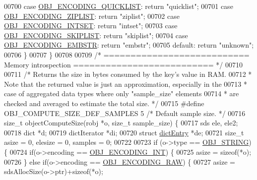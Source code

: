 \begin{DoxyCode}
{00700     \textcolor{keywordflow}{case} \hyperlink{server_8h_aec792aeed6d4bf83966672e6a23043b8}{OBJ\_ENCODING\_QUICKLIST}: \textcolor{keywordflow}{return} \textcolor{stringliteral}{"quicklist"};
00701     \textcolor{keywordflow}{case} \hyperlink{server_8h_aabf064ede983103f1fd0df2086e84eee}{OBJ\_ENCODING\_ZIPLIST}: \textcolor{keywordflow}{return} \textcolor{stringliteral}{"ziplist"};
00702     \textcolor{keywordflow}{case} \hyperlink{server_8h_a214173987de21c3b7661fddd42b05873}{OBJ\_ENCODING\_INTSET}: \textcolor{keywordflow}{return} \textcolor{stringliteral}{"intset"};
00703     \textcolor{keywordflow}{case} \hyperlink{server_8h_acfb35db5cb30ed113ed23aeb1a224c4c}{OBJ\_ENCODING\_SKIPLIST}: \textcolor{keywordflow}{return} \textcolor{stringliteral}{"skiplist"};
00704     \textcolor{keywordflow}{case} \hyperlink{server_8h_ac5bb76b546161fd0da4b0ff89b3142ee}{OBJ\_ENCODING\_EMBSTR}: \textcolor{keywordflow}{return} \textcolor{stringliteral}{"embstr"};
00705     \textcolor{keywordflow}{default}: \textcolor{keywordflow}{return} \textcolor{stringliteral}{"unknown"};
00706     \}
00707 \}
00708 
00709 \textcolor{comment}{/* =========================== Memory introspection ========================== */}
00710 
00711 \textcolor{comment}{/* Returns the size in bytes consumed by the key's value in RAM.}
00712 \textcolor{comment}{ * Note that the returned value is just an approximation, especially in the}
00713 \textcolor{comment}{ * case of aggregated data types where only "sample\_size" elements}
00714 \textcolor{comment}{ * are checked and averaged to estimate the total size. */}
00715 \textcolor{preprocessor}{#}\textcolor{preprocessor}{define} \textcolor{preprocessor}{OBJ\_COMPUTE\_SIZE\_DEF\_SAMPLES} 5 \textcolor{comment}{/* Default sample size. */}
00716 size\_t objectComputeSize(robj *o, size\_t sample\_size) \{
00717     sds ele, ele2;
00718     dict *d;
00719     dictIterator *di;
00720     \textcolor{keyword}{struct} \hyperlink{structdictEntry}{dictEntry} *de;
00721     size\_t asize = 0, elesize = 0, samples = 0;
00722 
00723     \textcolor{keywordflow}{if} (o->type == \hyperlink{server_8h_a65236ea160f69cdef33ec942092af88f}{OBJ\_STRING}) \{
00724         \textcolor{keywordflow}{if}(o->encoding == \hyperlink{server_8h_ae934cf008a0be0ef009c92c2d006a816}{OBJ\_ENCODING\_INT}) \{
00725             asize = \textcolor{keyword}{sizeof}(*o);
00726         \} \textcolor{keywordflow}{else} \textcolor{keywordflow}{if}(o->encoding == \hyperlink{server_8h_a148bc85e3074e324a6dc5eebcad1bcd5}{OBJ\_ENCODING\_RAW}) \{
00727             asize = sdsAllocSize(o->ptr)+\textcolor{keyword}{sizeof}(*o);
}
\end{DoxyCode}
